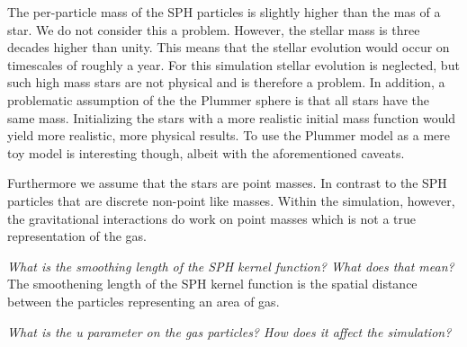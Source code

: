 \documentclass{aa}
\begin{document}
The per-particle mass of the SPH particles is slightly higher than the mas of a star. We do not consider this a problem. However, the stellar mass is three decades higher than unity. This means that the stellar evolution would occur on timescales of roughly a year. For this simulation stellar evolution is neglected, but such high mass stars are not physical and is therefore a problem. In addition, a problematic assumption of the the Plummer sphere is that all stars have the same mass. Initializing the stars with a more realistic initial mass function would yield more realistic, more physical results. To use the Plummer model as a mere toy model is interesting though, albeit with the aforementioned caveats.

Furthermore we assume that the stars are point masses. In contrast to the SPH particles that are discrete non-point like masses. Within the simulation, however, the gravitational interactions do work on point masses which is not a true representation of the gas.

\textit{What is the smoothing length of the SPH kernel function? What does that mean?}
The smoothening length of the SPH kernel function is the spatial distance between the particles representing an area of gas.

\textit{What is the u parameter on the gas particles? How does it affect the simulation?}
\end{document}
